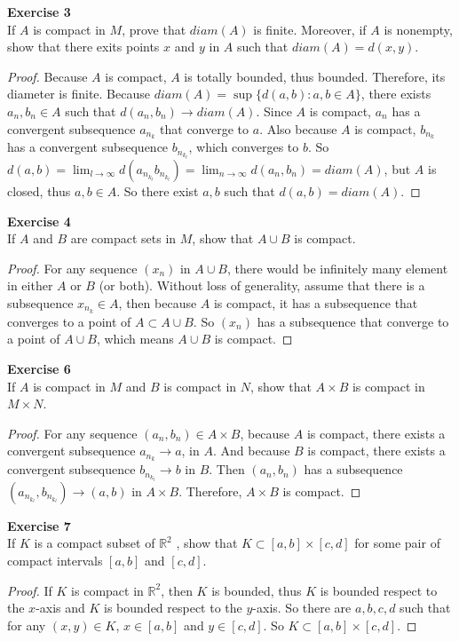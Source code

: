 \documentclass[12pt, a4paper]{article}
\theoremstyle{plain}
\newcommand{\R}{\mathbb{R}}
\newenvironment{exercise}[2][Exercise]
    { \begin{mdframed}[backgroundcolor=gray!20] \textbf{#1 #2} \\}
    {  \end{mdframed}}
\begin{document}
\begin{exercise}{3}
If $A$ is compact in $M$, prove that $diam(A)$ is finite. Moreover, if $A$ is nonempty, show that there exits points $x$ and $y$ in $A$ such that $diam(A)=d(x,y)$.
\end{exercise}
	\begin{proof}
	Because $A$ is compact, $A$ is totally bounded, thus bounded. Therefore, its diameter is finite. Because $diam(A)=\sup\{d(a,b):a,b\in A\}$, there exists $a_n,b_n\in A$ such that $d(a_n,b_n)\rightarrow diam(A)$. Since $A$ is compact, $a_n$ has a convergent subsequence $a_{n_k}$ that converge to $a$. Also because $A$ is compact, $b_{n_k}$ has a convergent subsequence $b_{n_{k_l}}$, which converges to $b$.	So $d(a,b)=\lim_{l\rightarrow\infty}d(a_{n_{k_l}}b_{n_{k_l}}) = \lim_{n\rightarrow\infty}d(a_n,b_n)=diam(A)$, but $A$ is closed, thus $a,b\in A$. So there exist $a,b$ such that $d(a,b)=diam(A)$.
	\end{proof}
	
\begin{exercise}{4}
If $A$ and $B$ are compact sets in $M$, show that $A\cup B$ is compact.
\end{exercise}
	\begin{proof}
	For any sequence $(x_n)$ in $A\cup B$, there would be infinitely many element in either $A$ or $B$ (or both). Without loss of generality, assume that there is a subsequence $x_{n_k}\in A$, then because $A$ is compact, it has a subsequence that converges to a point of $A\subset A\cup B$. So $(x_n)$ has a subsequence that converge to a point of $A\cup B$, which means $A\cup B$ is compact.
	\end{proof}
	
\begin{exercise}{6}
If $A$ is compact in $M$ and $B$ is compact in $N$, show that $A\times B$ is compact in $M\times N$.
\end{exercise}
	\begin{proof}
	For any sequence $(a_n,b_n)\in A\times B$, because $A$ is compact, there exists a convergent subsequence $a_{n_k}\rightarrow a$, in $A$. And because $B$ is compact, there exists a convergent subsequence $b_{n_{k_l}}\rightarrow b$ in $B$. Then $(a_n,b_n)$ has a subsequence $(a_{n_{k_l}},b_{n_{k_l}})\rightarrow (a,b)$ in $A\times B$. Therefore, $A\times B$ is compact.
	\end{proof}

\pagebreak

\begin{exercise}{7}
If $K$ is a compact subset of $\R^2$ , show that $K\subset [a,b]\times [c,d]$ for some pair of compact intervals $[a,b]$ and $[c,d]$.
\end{exercise}
	\begin{proof}
	If $K$ is compact in $\R^2$, then $K$ is bounded, thus $K$ is bounded respect to the $x$-axis and $K$ is bounded respect to the $y$-axis. So there are $ a,b,c,d $ such that for any $(x,y)\in K$, $x\in [a,b]$ and $y\in [c,d]$. So $K\subset [a,b]\times [c,d]$.
	\end{proof}
\end{document}
